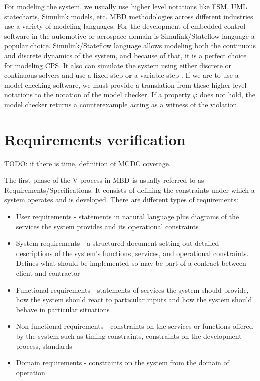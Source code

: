 For modeling the system, we usually use higher level notations like FSM, UML statecharts, Simulink models, etc. MBD methodologies across different industries use a variety of modeling languages. For the development of embedded control software in the automotive or aerospace domain is Simulink/Stateflow language a popular choice. Simulink/Stateflow language allows modeling both the continuous and discrete dynamics of the system, and because of that, it is a perfect choice for modeling CPS. It also can simulate the system using either discrete or continuous solvers and use a fixed-step or a variable-step \cite{Mohalik:ModelCheckingSimulink}. If we are to use a model checking software, we must provide a translation from these higher level notations to the notation of the model checker. If a property $\varphi$ does not hold, the model checker returns a counterexample acting as a witness of the violation.

\section{Requirements verification}
TODO: if there is time, definition of MCDC coverage.

The first phase of the V process in MBD is usually referred to as Requirements/Specifications. It consists of defining the constraints under which a system operates and is developed. There are different types of requirements:

\begin{itemize}
    \item User requirements - statements in natural language plus diagrams of the services the system provides and its operational constraints
    \item System requirements - a structured document setting out detailed descriptions of the system’s functions, services, and operational constraints. Defines what should be implemented so may be part of a contract between client and contractor
    \item Functional requirements - statements of services the system should provide, how the system should react to particular inputs and how the system should behave in particular situations
    \item Non-functional requirements - constraints on the services or functions offered by the system such as timing constraints, constraints on the development process, standards
    \item Domain requirements - constraints on the system from the domain of operation
\end{itemize}

